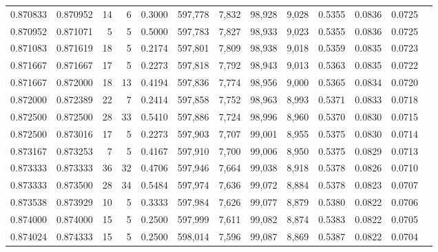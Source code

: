 \begin{tabular}{rrrrrrrrrrrrr}
0.870833 & 0.870952 &    14 &   6 &                                     0.3000 & 597,778 &   7,832 &  98,928 &   9,028 & 0.5355 & 0.0836 & 0.0725 \\
0.870952 & 0.871071 &     5 &   5 &                                     0.5000 & 597,783 &   7,827 &  98,933 &   9,023 & 0.5355 & 0.0836 & 0.0725 \\
0.871083 & 0.871619 &    18 &   5 &                                     0.2174 & 597,801 &   7,809 &  98,938 &   9,018 & 0.5359 & 0.0835 & 0.0723 \\
0.871667 & 0.871667 &    17 &   5 &                                     0.2273 & 597,818 &   7,792 &  98,943 &   9,013 & 0.5363 & 0.0835 & 0.0722 \\
0.871667 & 0.872000 &    18 &  13 &                                     0.4194 & 597,836 &   7,774 &  98,956 &   9,000 & 0.5365 & 0.0834 & 0.0720 \\
0.872000 & 0.872389 &    22 &   7 &                                     0.2414 & 597,858 &   7,752 &  98,963 &   8,993 & 0.5371 & 0.0833 & 0.0718 \\
0.872500 & 0.872500 &    28 &  33 &                                     0.5410 & 597,886 &   7,724 &  98,996 &   8,960 & 0.5370 & 0.0830 & 0.0715 \\
0.872500 & 0.873016 &    17 &   5 &                                     0.2273 & 597,903 &   7,707 &  99,001 &   8,955 & 0.5375 & 0.0830 & 0.0714 \\
0.873167 & 0.873253 &     7 &   5 &                                     0.4167 & 597,910 &   7,700 &  99,006 &   8,950 & 0.5375 & 0.0829 & 0.0713 \\
0.873333 & 0.873333 &    36 &  32 &                                     0.4706 & 597,946 &   7,664 &  99,038 &   8,918 & 0.5378 & 0.0826 & 0.0710 \\
0.873333 & 0.873500 &    28 &  34 &                                     0.5484 & 597,974 &   7,636 &  99,072 &   8,884 & 0.5378 & 0.0823 & 0.0707 \\
0.873538 & 0.873929 &    10 &   5 &                                     0.3333 & 597,984 &   7,626 &  99,077 &   8,879 & 0.5380 & 0.0822 & 0.0706 \\
0.874000 & 0.874000 &    15 &   5 &                                     0.2500 & 597,999 &   7,611 &  99,082 &   8,874 & 0.5383 & 0.0822 & 0.0705 \\
0.874024 & 0.874333 &    15 &   5 &                                     0.2500 & 598,014 &   7,596 &  99,087 &   8,869 & 0.5387 & 0.0822 & 0.0704 \\

\end{tabular}
